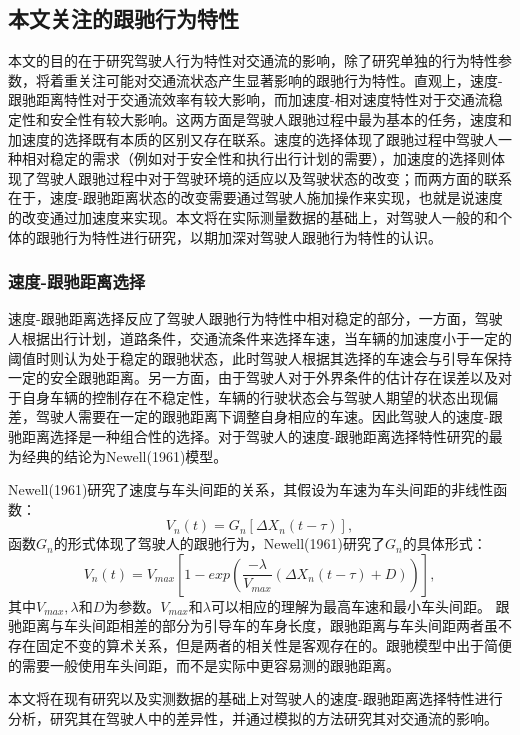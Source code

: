 \subsection{本文关注的跟驰行为特性}
本文的目的在于研究驾驶人行为特性对交通流的影响，除了研究单独的行为特性参数，将着重关注可能对交通流状态产生显著影响的跟驰行为特性。直观上，速度-跟驰距离特性对于交通流效率有较大影响，而加速度-相对速度特性对于交通流稳定性和安全性有较大影响。这两方面是驾驶人跟驰过程中最为基本的任务，速度和加速度的选择既有本质的区别又存在联系。速度的选择体现了跟驰过程中驾驶人一种相对稳定的需求（例如对于安全性和执行出行计划的需要），加速度的选择则体现了驾驶人跟驰过程中对于驾驶环境的适应以及驾驶状态的改变；而两方面的联系在于，速度-跟驰距离状态的改变需要通过驾驶人施加操作来实现，也就是说速度的改变通过加速度来实现。本文将在实际测量数据的基础上，对驾驶人一般的和个体的跟驰行为特性进行研究，以期加深对驾驶人跟驰行为特性的认识。
\subsubsection{速度-跟驰距离选择}
速度-跟驰距离选择反应了驾驶人跟驰行为特性中相对稳定的部分，一方面，驾驶人根据出行计划，道路条件，交通流条件来选择车速，当车辆的加速度小于一定的阈值时则认为处于稳定的跟驰状态，此时驾驶人根据其选择的车速会与引导车保持一定的安全跟驰距离。另一方面，由于驾驶人对于外界条件的估计存在误差以及对于自身车辆的控制存在不稳定性，车辆的行驶状态会与驾驶人期望的状态出现偏差，驾驶人需要在一定的跟驰距离下调整自身相应的车速。因此驾驶人的速度-跟驰距离选择是一种组合性的选择。对于驾驶人的速度-跟驰距离选择特性研究的最为经典的结论为Newell(1961)模型。

Newell(1961)研究了速度与车头间距的关系，其假设为车速为车头间距的非线性函数\cite{Newell1961}：
\begin{equation}
V_n(t)=G_n[\Delta X_n(t-\tau)],
\end{equation}
函数$G_n$的形式体现了驾驶人的跟驰行为，Newell(1961)研究了$G_n$的具体形式\cite{Newell1961}：
\begin{equation}
V_n(t)=V_{max}\left[1-exp\left(\frac{-\lambda}{V_{max}}(\Delta X_n(t-\tau)+D)\right)\right],
\end{equation}
其中$V_{max},\lambda$和$D$为参数。$V_{max}$和$\lambda$可以相应的理解为最高车速和最小车头间距。
跟驰距离与车头间距相差的部分为引导车的车身长度，跟驰距离与车头间距两者虽不存在固定不变的算术关系，但是两者的相关性是客观存在的。跟驰模型中出于简便的需要一般使用车头间距，而不是实际中更容易测的跟驰距离。

本文将在现有研究以及实测数据的基础上对驾驶人的速度-跟驰距离选择特性进行分析，研究其在驾驶人中的差异性，并通过模拟的方法研究其对交通流的影响。


